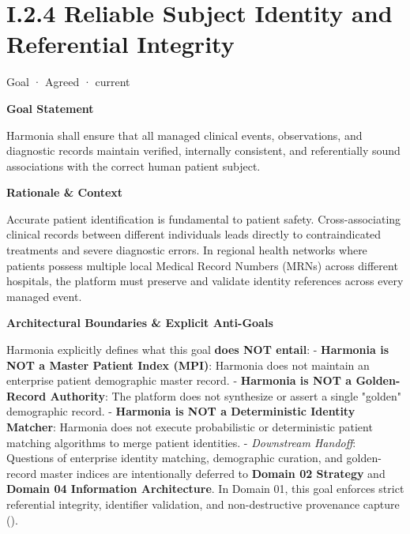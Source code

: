 \section*{I.2.4 Reliable Subject Identity and Referential Integrity}
\label{navigation:I.2.4}

\label{element:e2f8b62e2cbd486282d68b6009c06de6}
{\small Goal · Agreed · current}\par

\par\medskip\textbf{Goal Statement}\par


Harmonia shall ensure that all managed clinical events, observations, and diagnostic records maintain verified, internally consistent, and referentially sound associations with the correct human patient subject.



\par\medskip\textbf{Rationale \& Context}\par


Accurate patient identification is fundamental to patient safety. Cross-associating clinical records between different individuals leads directly to contraindicated treatments and severe diagnostic errors. In regional health networks where patients possess multiple local Medical Record Numbers (MRNs) across different hospitals, the platform must preserve and validate identity references across every managed event.



\par\medskip\textbf{Architectural Boundaries \& Explicit Anti-Goals}\par


Harmonia explicitly defines what this goal \textbf{does NOT entail}:
- \textbf{Harmonia is NOT a Master Patient Index (MPI)}: Harmonia does not maintain an enterprise patient demographic master record.
- \textbf{Harmonia is NOT a Golden-Record Authority}: The platform does not synthesize or assert a single "golden" demographic record.
- \textbf{Harmonia is NOT a Deterministic Identity Matcher}: Harmonia does not execute probabilistic or deterministic patient matching algorithms to merge patient identities.
- \emph{Downstream Handoff}: Questions of enterprise identity matching, demographic curation, and golden-record master indices are intentionally deferred to \textbf{Domain 02 Strategy} and \textbf{Domain 04 Information Architecture}. In Domain 01, this goal enforces strict referential integrity, identifier validation, and non-destructive provenance capture (\href{\detokenize{../../../../../../../../../docs/markdown/01-motivation/requirements-constraints/foundational-requirements.md}}{\texttt{}}).


